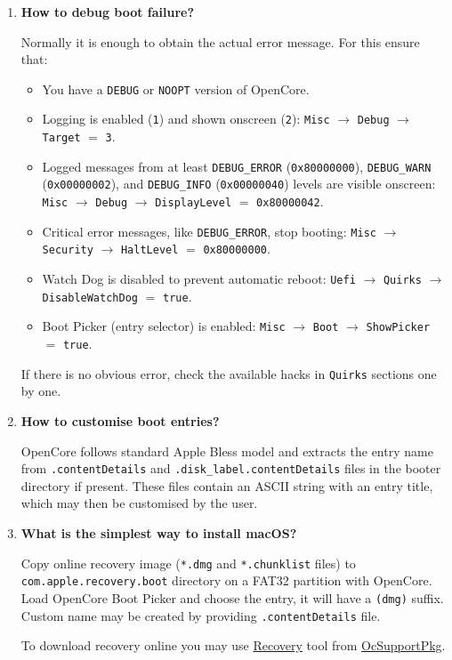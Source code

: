 \documentclass[]{article}
\providecommand{\tightlist}{%
  \setlength{\itemsep}{0pt}\setlength{\parskip}{0pt}}
\begin{document}
\begin{enumerate}
\item
  \textbf{How to debug boot failure?}

  Normally it is enough to obtain the actual error message. For this
  ensure that:
  \begin{itemize}
  \tightlist
  \item You have a \texttt{DEBUG} or \texttt{NOOPT} version of OpenCore.
  \item Logging is enabled (\texttt{1}) and shown onscreen (\texttt{2}):
  \texttt{Misc} $\rightarrow$ \texttt{Debug} $\rightarrow$ \texttt{Target}
  $=$ \texttt{3}.
  \item Logged messages from at least \texttt{DEBUG\_ERROR}
  (\texttt{0x80000000}), \texttt{DEBUG\_WARN} (\texttt{0x00000002}), and
  \texttt{DEBUG\_INFO} (\texttt{0x00000040}) levels are visible onscreen:
  \texttt{Misc} $\rightarrow$ \texttt{Debug} $\rightarrow$ \texttt{DisplayLevel}
  $=$ \texttt{0x80000042}.
  \item Critical error messages, like \texttt{DEBUG\_ERROR}, stop booting:
  \texttt{Misc} $\rightarrow$ \texttt{Security}
  $\rightarrow$ \texttt{HaltLevel} $=$ \texttt{0x80000000}.
  \item Watch Dog is disabled to prevent automatic reboot:
  \texttt{Uefi} $\rightarrow$ \texttt{Quirks} $\rightarrow$
  \texttt{DisableWatchDog} $=$ \texttt{true}.
  \item Boot Picker (entry selector) is enabled: \texttt{Misc}
  $\rightarrow$ \texttt{Boot} $\rightarrow$ \texttt{ShowPicker} $=$ \texttt{true}.
  \end{itemize}

  If there is no obvious error, check the available hacks in \texttt{Quirks} sections
  one by one.

\item
  \textbf{How to customise boot entries?}

  OpenCore follows standard Apple Bless model and extracts the entry name
  from \texttt{.contentDetails} and \texttt{.disk\_label.contentDetails} files in the
  booter directory if present. These files contain an ASCII string with an entry title,
  which may then be customised by the user.

\item
  \textbf{What is the simplest way to install macOS?}

  Copy online recovery image (\texttt{*.dmg} and \texttt{*.chunklist} files)
  to \texttt{com.apple.recovery.boot} directory on a FAT32 partition with OpenCore.
  Load OpenCore Boot Picker and choose the entry, it will have a \texttt{(dmg)} suffix.
  Custom name may be created by providing \texttt{.contentDetails} file.

  To download recovery online you may use
  \href{https://github.com/acidanthera/OcSupportPkg/tree/master/Tools/Recovery}{Recovery} 
  tool from \href{https://github.com/acidanthera/OcSupportPkg}{OcSupportPkg}.

\end{enumerate}
\end{document}
